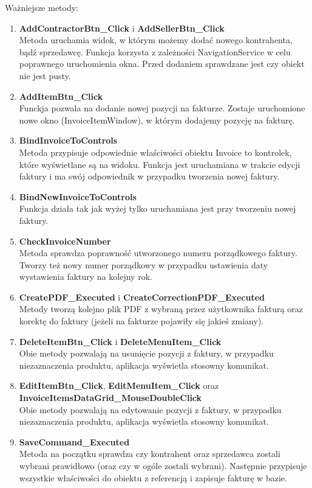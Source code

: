 Ważniejsze metody:
\begin{enumerate}
    \item \textbf{AddContractorBtn\_Click} i \textbf{AddSellerBtn\_Click} \\
    Metoda uruchamia widok, w którym możemy dodać nowego kontrahenta, bądź sprzedawcę. Funkcja korzysta z zależności NavigationService w celu poprawnego uruchomienia okna. Przed dodaniem sprawdzane jest czy obiekt nie jest pusty.
    \item \textbf{AddItemBtn\_Click} \\
    Funckja pozwala na dodanie nowej pozycji na fakturze. Zostaje uruchomione nowe okno (InvoiceItemWindow), w którym dodajemy pozycję na fakturę.
    \item \textbf{BindInvoiceToControls} \\
    Metoda przypisuje odpowiednie właściwości obiektu Invoice to kontrolek, które wyświetlane są na widoku. Funkcja jest uruchamiana w trakcie edycji faktury i ma swój odpowiednik w przypadku tworzenia nowej faktury.
    \item \textbf{BindNewInvoiceToControls} \\
    Funkcja działa tak jak wyżej tylko uruchamiana jest przy tworzeniu nowej faktury.
    \item \textbf{CheckInvoiceNumber} \\
    Metoda sprawdza poprawność utworzonego numeru porządkowego faktury. Tworzy też nowy numer porządkowy w przypadku ustawienia daty wystawienia faktury na kolejny rok.
    \item \textbf{CreatePDF\_Executed} i \textbf{CreateCorrectionPDF\_Executed} \\
    Metody tworzą kolejno plik PDF z wybraną przez użytkownika fakturą oraz korektę do faktury (jeżeli na fakturze pojawiły się jakieś zmiany). 
    \item \textbf{DeleteItemBtn\_Click} i \textbf{DeleteMenuItem\_Click} \\
    Obie metody pozwalają na usunięcie pozycji z faktury, w przypadku niezaznaczenia produktu, aplikacja wyświetla stosowny komunikat. 
    \item \textbf{EditItemBtn\_Click}, \textbf{EditMenuItem\_Click} oraz \\
    \textbf{InvoiceItemsDataGrid\_MouseDoubleClick} \\
    Obie metody pozwalają na edytowanie pozycji z faktury, w przypadku niezaznaczenia produktu, aplikacja wyświetla stosowny komunikat. 
    \item \textbf{SaveCommand\_Executed} \\
    Metoda na początku sprawdza czy kontrahent oraz sprzedawca zostali wybrani prawidłowo (oraz czy w ogóle zostali wybrani). Następnie przypisuje wszystkie właściwości do obiektu z referencją i zapisuje fakturę w bazie.
\end{enumerate}


